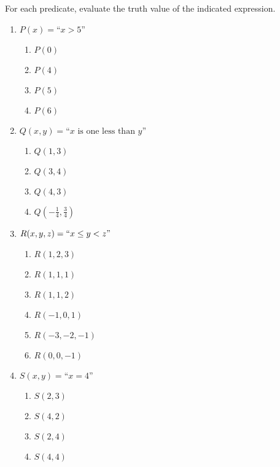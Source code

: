 \begin{xca}
	
	 For each predicate, evaluate the truth value of the indicated expression.
		
		\begin{enumerate}
				\item $P(x) = \textrm{``\(x > 5\)''}$
					\begin{enumerate}
							\item $P(0)$
							\item $P(4)$
							\item $P(5)$
							\item $P(6)$
						\end{enumerate}
				\item $Q(x,y) = \textrm{``\(x\) is one less than \(y\)''}$
						\begin{enumerate}
								\item $Q(1,3)$
								\item $Q(3,4)$
								\item $Q(4,3)$
								\item $Q(-\frac{1}{4}, \frac{3}{4})$
							\end{enumerate} 
				\item $R(x,y,z) = \textrm{``\( x \leq y < z\)''}$
					\begin{enumerate}
							\item $R(1,2,3)$
							\item $R(1,1,1)$
							\item $R(1,1,2)$
							\item $R(-1,0,1)$
							\item $R(-3,-2,-1)$
							\item $R(0,0,-1)$
						\end{enumerate}
				\item $S(x,y) = \textrm{``\(x = 4\)''}$
					\begin{enumerate}
							\item $S(2,3)$
							\item $S(4,2)$
							\item $S(2,4)$
							\item $S(4,4)$
						\end{enumerate}
			\end{enumerate}
	\end{xca}

